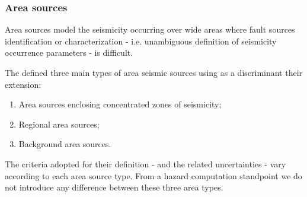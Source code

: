 \subsubsection{Area sources}
\label{hazard:seismic_source_types:areaSources}
Area sources model the seismicity occurring over wide areas where fault 
sources identification or characterization - i.e. unambiguous definition 
of seismicity occurrence parameters - is difficult. 

The \citet{sshac1997} defined three main types of area seismic sources using as 
a discriminant their extension:
\begin{enumerate}
\item Area sources enclosing concentrated zones of seismicity;
\item Regional area sources;
\item Background area sources.
\end{enumerate}
The criteria adopted for their definition - and the related uncertainties - vary 
according to each area source type. From a hazard computation standpoint we do 
not introduce any difference between these three area types.
%
